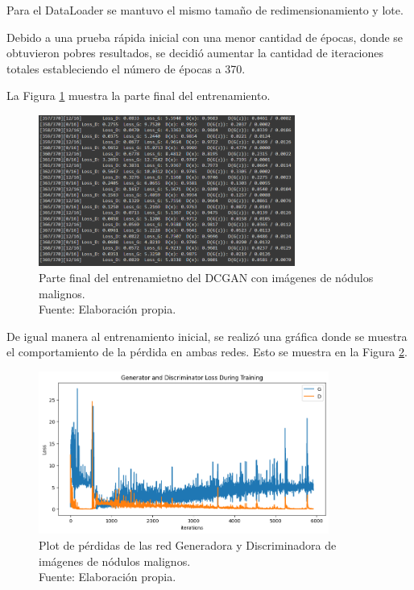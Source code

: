 Para el DataLoader se mantuvo el mismo tamaño de redimensionamiento y lote.

Debido a una prueba rápida inicial con una menor cantidad de épocas, donde se obtuvieron pobres resultados, se decidió aumentar la cantidad de iteraciones totales estableciendo el número de épocas a 370.

La Figura \ref{4:fig116} muestra la parte final del entrenamiento.

\begin{figure}[H]
	\begin{center}
		\includegraphics[width=0.75\textwidth]{4/figures/dcgan_2_train.PNG}
		\caption[Parte final del entrenamietno del DCGAN con imágenes de nódulos malignos]{Parte final del entrenamietno del DCGAN con imágenes de nódulos malignos. \\
		Fuente: Elaboración propia.}
		\label{4:fig116}
	\end{center}
\end{figure}

De igual manera al entrenamiento inicial, se realizó una gráfica donde se muestra el comportamiento de la pérdida en ambas redes. Esto se muestra en la Figura \ref{4:fig117}.

\begin{figure}[H]
	\begin{center}
		\includegraphics[width=0.85\textwidth]{4/figures/plot_loss_2.png}
		\caption[Plot de pérdidas de las red Generadora y Discriminadora de imágenes de nódulos malignos]{Plot de pérdidas de las red Generadora y Discriminadora de imágenes de nódulos malignos. \\
		Fuente: Elaboración propia.}
		\label{4:fig117}
	\end{center}
\end{figure}

